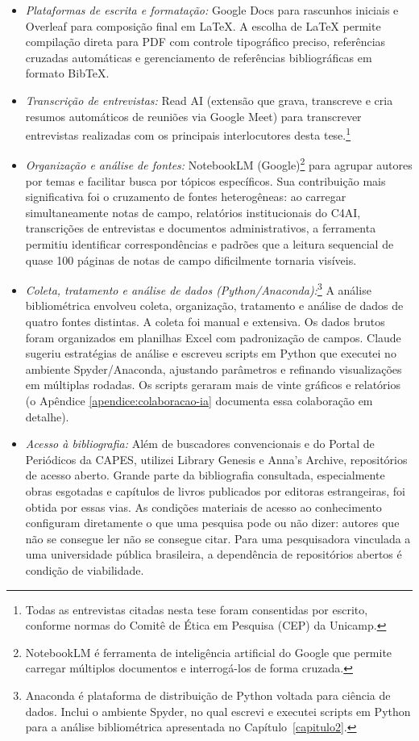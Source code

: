 \begin{itemize}
\item \textit{Plataformas de escrita e formatação:} Google Docs para rascunhos iniciais e Overleaf para composição final em LaTeX. A escolha de LaTeX permite compilação direta para PDF com controle tipográfico preciso, referências cruzadas automáticas e gerenciamento de referências bibliográficas em formato BibTeX.

\item \textit{Transcrição de entrevistas:} Read AI (extensão que grava, transcreve e cria resumos automáticos de reuniões via Google Meet) para transcrever entrevistas realizadas com os principais interlocutores desta tese.\footnote{Todas as entrevistas citadas nesta tese foram consentidas por escrito, conforme normas do Comitê de Ética em Pesquisa (CEP) da Unicamp.}

\item \textit{Organização e análise de fontes:} NotebookLM (Google)\footnote{NotebookLM é ferramenta de inteligência artificial do Google que permite carregar múltiplos documentos e interrogá-los de forma cruzada.} para agrupar autores por temas e facilitar busca por tópicos específicos. Sua contribuição mais significativa foi o cruzamento de fontes heterogêneas: ao carregar simultaneamente notas de campo, relatórios institucionais do C4AI, transcrições de entrevistas e documentos administrativos, a ferramenta permitiu identificar correspondências e padrões que a leitura sequencial de quase 100 páginas de notas de campo dificilmente tornaria visíveis.

\item \textit{Coleta, tratamento e análise de dados (Python/Anaconda):}\footnote{Anaconda é plataforma de distribuição de Python voltada para ciência de dados. Inclui o ambiente Spyder, no qual escrevi e executei scripts em Python para a análise bibliométrica apresentada no Capítulo~\ref{capitulo2}.} A análise bibliométrica envolveu coleta, organização, tratamento e análise de dados de quatro fontes distintas. A coleta foi manual e extensiva. Os dados brutos foram organizados em planilhas Excel com padronização de campos. Claude sugeriu estratégias de análise e escreveu scripts em Python que executei no ambiente Spyder/Anaconda, ajustando parâmetros e refinando visualizações em múltiplas rodadas. Os scripts geraram mais de vinte gráficos e relatórios (o Apêndice \ref{apendice:colaboracao-ia} documenta essa colaboração em detalhe).

\item \textit{Acesso à bibliografia:} Além de buscadores convencionais e do Portal de Periódicos da CAPES, utilizei Library Genesis e Anna's Archive, repositórios de acesso aberto. Grande parte da bibliografia consultada, especialmente obras esgotadas e capítulos de livros publicados por editoras estrangeiras, foi obtida por essas vias. As condições materiais de acesso ao conhecimento configuram diretamente o que uma pesquisa pode ou não dizer: autores que não se consegue ler não se consegue citar. Para uma pesquisadora vinculada a uma universidade pública brasileira, a dependência de repositórios abertos é condição de viabilidade.

\end{itemize}

